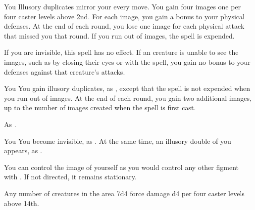 \begin{spelltarget}{You}
    \spelleffect Illusory duplicates mirror your every move. You gain four images \add one per four caster levels above 2nd. For each image, you gain a  bonus to your physical defenses. At the end of each round, you lose one image for each physical attack that missed you that round. If you run out of images, the spell is expended.
\end{spelltarget}
\spellnotes If you are invisible, this spell has no effect. If an creature is unable to see the images, such as by closing their eyes or with the  spell, you gain no bonus to your defenses against that creature's attacks.

\spelldur{\durshort \dismissable}
\begin{spelltarget}{You}
    \spelleffect You gain illusory duplicates, as , except that the spell is not expended when you run out of images. At the end of each round, you gain two additional images, up to the number of images created when the spell is first cast.
\end{spelltarget}
\spellnotes As .

\spelldur{\durshort \dismissable}
\begin{spelltarget}{You}
    \spelleffect You become invisible, as . At the same time, an illusory double of you appears, as .

    You can control the image of yourself as you would control any other figment with . If not directed, it remains stationary.
\end{spelltarget}

\begin{spelltargets}{Any number of creatures in the area}
    \spelleffect 7d4 force damage \add d4 per four caster levels above 14th.
\end{spelltargets}

